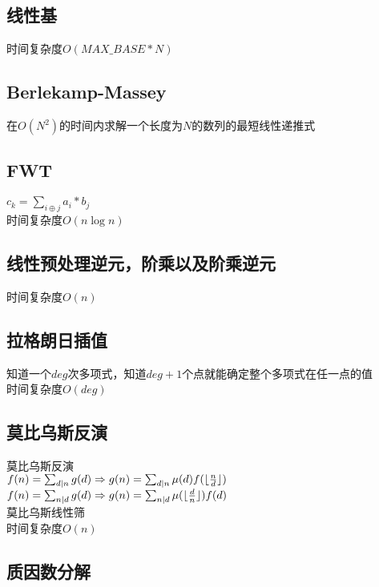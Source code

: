 \subsection{线性基}
时间复杂度$O(MAX\_BASE*N)$\\


\subsection{Berlekamp-Massey}
在$O(N^2)$的时间内求解一个长度为$N$的数列的最短线性递推式\\


\subsection{FWT}
$c_k=\sum_{i \oplus j} a_i*b_j$ \\
时间复杂度$O(n\log n)$\\


\subsection{线性预处理逆元，阶乘以及阶乘逆元}
时间复杂度$O(n)$\\


\subsection{拉格朗日插值}
知道一个$deg$次多项式，知道$deg+1$个点就能确定整个多项式在任一点的值\\
时间复杂度$O(deg)$\\


\subsection{莫比乌斯反演}
莫比乌斯反演\\
$f(n)=\sum_{d|n}g(d) \Rightarrow g(n) = \sum_{d|n}\mu(d)f(\lfloor{n\over d}\rfloor)$ \\
$f(n)=\sum_{n|d}g(d) \Rightarrow g(n) = \sum_{n|d}\mu(\lfloor{d\over n}\rfloor)f(d)$ \\
莫比乌斯线性筛\\
时间复杂度$O(n)$ \\


\subsection{质因数分解}
